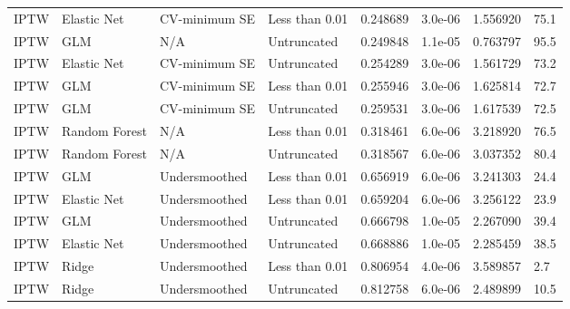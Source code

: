 \begin{longtable}[l]{llllllll}
IPTW & Elastic Net & CV-minimum SE & Less than 0.01 & 0.248689 & 3.0e-06 & 1.556920 & 75.1\\
IPTW & GLM & N/A & Untruncated & 0.249848 & 1.1e-05 & 0.763797 & 95.5\\
IPTW & Elastic Net & CV-minimum SE & Untruncated & 0.254289 & 3.0e-06 & 1.561729 & 73.2\\
IPTW & GLM & CV-minimum SE & Less than 0.01 & 0.255946 & 3.0e-06 & 1.625814 & 72.7\\
IPTW & GLM & CV-minimum SE & Untruncated & 0.259531 & 3.0e-06 & 1.617539 & 72.5\\
IPTW & Random Forest & N/A & Less than 0.01 & 0.318461 & 6.0e-06 & 3.218920 & 76.5\\
IPTW & Random Forest & N/A & Untruncated & 0.318567 & 6.0e-06 & 3.037352 & 80.4\\
IPTW & GLM & Undersmoothed & Less than 0.01 & 0.656919 & 6.0e-06 & 3.241303 & 24.4\\
IPTW & Elastic Net & Undersmoothed & Less than 0.01 & 0.659204 & 6.0e-06 & 3.256122 & 23.9\\
IPTW & GLM & Undersmoothed & Untruncated & 0.666798 & 1.0e-05 & 2.267090 & 39.4\\
IPTW & Elastic Net & Undersmoothed & Untruncated & 0.668886 & 1.0e-05 & 2.285459 & 38.5\\
IPTW & Ridge & Undersmoothed & Less than 0.01 & 0.806954 & 4.0e-06 & 3.589857 & 2.7\\
IPTW & Ridge & Undersmoothed & Untruncated & 0.812758 & 6.0e-06 & 2.489899 & 10.5\\
\bottomrule
\end{longtable}
